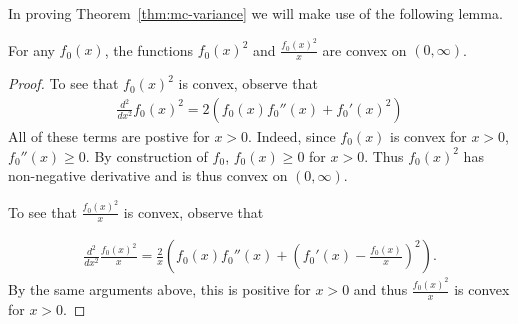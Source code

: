 
In proving Theorem~\ref{thm:mc-variance} we will make use of the following lemma.

\begin{lemma}\label{lemma:f0-x-convex}
For any $f_0(x)$,
the functions $f_0(x)^2$ and $\frac{f_0(x)^2}{x}$ are convex on $(0, \infty)$.
\end{lemma}
\begin{proof}
To see that $f_0(x)^2$ is convex, observe that 
\begin{align*}
    \frac{d^2}{dx^2} f_0(x)^2 = 2\left( f_0(x) f_0''(x) + f_0'(x)^2 \right)
\end{align*}
All of these terms are postive for $x > 0$.
Indeed, since $f_0(x)$ is convex for $x > 0$, $f_0''(x) \geq 0$.  
By construction of $f_0$, $f_0(x) \geq 0$ for $x > 0$. 
Thus $f_0(x)^2$ has non-negative derivative and is thus convex on $(0, \infty)$.

To see that $\frac{f_0(x)^2}{x}$ is convex, observe that

\begin{align*}
    \frac{d^2}{dx^2} \frac{f_0(x)^2}{x} = \frac{2}{x}\left( f_0(x) f_0''(x) + \left(f_0'(x) - \frac{f_0(x)}{x}\right)^2 \right).
\end{align*}
By the same arguments above, this is positive for $x > 0$ and thus $\frac{f_0(x)^2}{x}$ is convex for $x>0$.
\end{proof}

